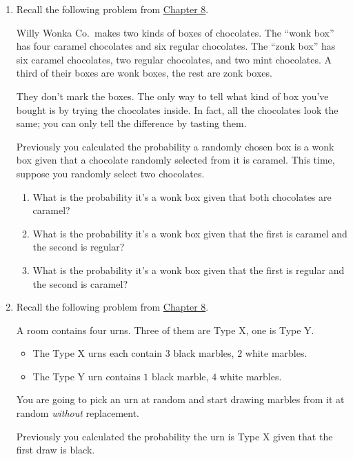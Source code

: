 \documentclass[justified]{tufte-book}
\providecommand{\tightlist}{%
  \setlength{\itemsep}{0pt}\setlength{\parskip}{0pt}}
\theoremstyle{definition}
\theoremstyle{definition}
\theoremstyle{definition}
\theoremstyle{remark}
\begin{document}
\begin{enumerate}
\item
  Recall the following problem from
  \protect\hyperlink{bayes-theorem}{Chapter 8}.

  Willy Wonka Co.~makes two kinds of boxes of chocolates. The ``wonk
  box'' has four caramel chocolates and six regular chocolates. The
  ``zonk box'' has six caramel chocolates, two regular chocolates, and
  two mint chocolates. A third of their boxes are wonk boxes, the rest
  are zonk boxes.

  They don't mark the boxes. The only way to tell what kind of box
  you've bought is by trying the chocolates inside. In fact, all the
  chocolates look the same; you can only tell the difference by tasting
  them.

  Previously you calculated the probability a randomly chosen box is a
  wonk box given that a chocolate randomly selected from it is caramel.
  This time, suppose you randomly select two chocolates.

  \begin{enumerate}
  \def\labelenumii{\alph{enumii}.}
  \tightlist
  \item
    What is the probability it's a wonk box given that both chocolates
    are caramel?
  \item
    What is the probability it's a wonk box given that the first is
    caramel and the second is regular?
  \item
    What is the probability it's a wonk box given that the first is
    regular and the second is caramel?
  \end{enumerate}
\item
  Recall the following problem from
  \protect\hyperlink{bayes-theorem}{Chapter 8}.

  A room contains four urns. Three of them are Type X, one is Type Y.

  \begin{itemize}
  \tightlist
  \item
    The Type X urns each contain \(3\) black marbles, \(2\) white
    marbles.
  \item
    The Type Y urn contains \(1\) black marble, \(4\) white marbles.
  \end{itemize}

  You are going to pick an urn at random and start drawing marbles from
  it at random \emph{without} replacement.

  Previously you calculated the probability the urn is Type X given that
  the first draw is black.


\end{enumerate}
\end{document}
